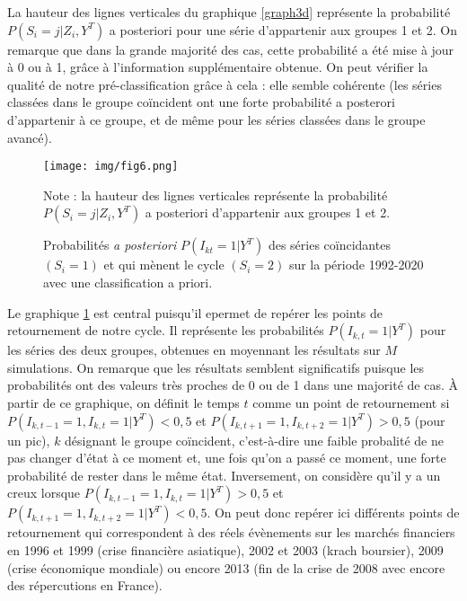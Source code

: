 \documentclass[10pt,french,french]{article}
\begin{document}
La hauteur des lignes verticales du graphique \ref{graph3d} représente la probabilité \(P(S_i = j|Z_i,Y^T)\) a posteriori pour une série d'appartenir aux groupes 1 et 2.
On remarque que dans la grande majorité des cas, cette probabilité a été mise à jour à 0 ou à 1, grâce à l'information supplémentaire obtenue.
On peut vérifier la qualité de notre pré-classification grâce à cela : elle semble cohérente (les séries classées dans le groupe coïncident ont une forte probabilité a posterori d'appartenir à ce groupe, et de même pour les séries classées dans le groupe avancé).

\begin{figure}[htb]
\centering
\texttt{[image: img/fig6.png]}
\caption{Probabilités \textit{a posteriori} $P(I_{kt}=1|Y^T)$ des séries coïncidantes $(S_i=1)$ et qui mènent le cycle $(S_i=2)$ sur la période 1992-2020 avec une classification a priori.}\label{retournements}
\footnotesize
Note : la hauteur des lignes verticales représente la probabilité $P(S_i = j|Z_i,Y^T)$ a posteriori d'appartenir aux groupes 1 et 2.
\end{figure}

Le graphique \ref{retournements} est central puisqu'il epermet de repérer les points de retournement de notre cycle.
Il représente les probabilités \(P(I_{k,t} = 1|Y^T)\) pour les séries des deux groupes, obtenues en moyennant les résultats sur \(M\) simulations.
On remarque que les résultats semblent significatifs puisque les probabilités ont des valeurs très proches de 0 ou de 1 dans une majorité de cas.
À partir de ce graphique, on définit le temps \(t\) comme un point de retournement si \(P(I_{k,t-1} = 1, I_{k,t} = 1 | Y^T) < 0,5\) et \(P(I_{k,t+1} = 1, I_{k,t+2} = 1 | Y^T) > 0,5\) (pour un pic), \(k\) désignant le groupe coïncident, c'est-à-dire une faible probalité de ne pas changer d'état à ce moment et, une fois qu'on a passé ce moment, une forte probabilité de rester dans le même état. Inversement, on considère qu'il y a un creux lorsque \(P(I_{k,t-1} = 1, I_{k,t} = 1 | Y^T) > 0,5\) et \(P(I_{k,t+1} = 1, I_{k,t+2} = 1 | Y^T) < 0,5\).
On peut donc repérer ici différents points de retournement qui correspondent à des réels évènements sur les marchés financiers en 1996 et 1999 (crise financière asiatique), 2002 et 2003 (krach boursier), 2009 (crise économique mondiale) ou encore 2013 (fin de la crise de 2008 avec encore des répercutions en France).
\end{document}
